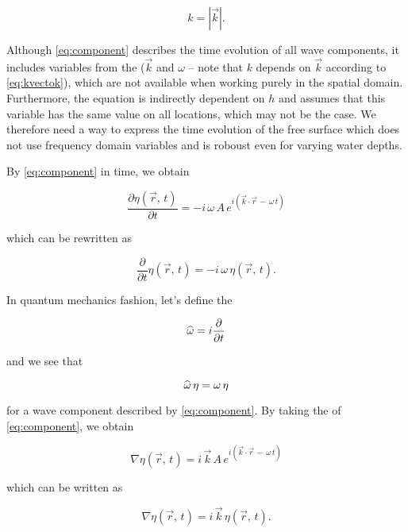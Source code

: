\begin{equation} \label{eq:kvectok}
k = \left|\vec{k}\right|.
\end{equation}

Although \eqref{eq:component} describes the time evolution of all wave components, it includes variables from the  ($\vec{k}$ and $\omega$ -- note that $k$ depends on $\vec{k}$ according to \eqref{eq:kvectok}), which are not available when working purely in the spatial domain. Furthermore, the equation is indirectly dependent on $h$ and assumes that this variable has the same value on all locations, which may not be the case. We therefore need a way to express the time evolution of the free surface which does not use frequency domain variables and is roboust even for varying water depths.

By  \eqref{eq:component} in time, we obtain

\begin{equation}
\frac{\partial\eta(\vec{r},\,t)}{\partial t} = -i\,\omega\,A\,e^{i(\vec{k}\cdot\vec{r}\,-\,\omega\,t)}
\end{equation}

which can be rewritten as

\begin{equation}
\frac{\partial}{\partial t}\eta(\vec{r},\,t) = -i\,\omega\,\eta(\vec{r},\,t).
\end{equation}

In quantum mechanics fashion, let's define the 

\begin{equation} \label{eq:opomega}
\widehat{\omega} = i\frac{\partial}{\partial t}
\end{equation}

and we see that

\begin{equation} \label{eq:opomegaaction}
\widehat{\omega}\,\eta = \omega\,\eta
\end{equation}

for a wave component described by \eqref{eq:component}. By taking the  of \eqref{eq:component}, we obtain

\begin{equation}
\nabla\eta(\vec{r},\,t) = i\,\vec{k}\,A\,e^{i(\vec{k}\cdot\vec{r}\,-\,\omega\,t)}
\end{equation}

which can be written as

\begin{equation}
\nabla\eta(\vec{r},\,t) = i\,\vec{k}\,\eta(\vec{r},\,t).
\end{equation}

